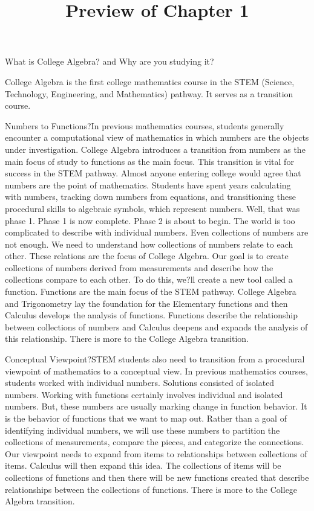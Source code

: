 \documentclass{ximera}
\title{Preview of Chapter 1}
\begin{document}
\begin{abstract}
\end{abstract}

\maketitle


What is College Algebra?
and
Why are you studying it?


College Algebra is the first college mathematics course in the STEM (Science, Technology, Engineering, and Mathematics) pathway. It serves as a transition course.

Numbers to Functions?In previous mathematics courses, students generally encounter a computational view of mathematics in which numbers are the objects under investigation. College Algebra introduces a transition from numbers as the main focus of study to functions as the main focus. This transition is vital for success in the STEM pathway.
Almost anyone entering college would agree that numbers are the point of mathematics.  Students have spent years calculating with numbers, tracking down numbers from equations, and transitioning these procedural skills to algebraic symbols, which represent numbers. Well, that was phase 1.  Phase 1 is now complete.  Phase 2 is about to begin.
The world is too complicated to describe with individual numbers. Even collections of numbers are not enough. We need to understand how collections of numbers relate to each other. These relations are the focus of College Algebra.
Our goal is to create collections of numbers derived from measurements and describe how the collections compare to each other. To do this, we?ll create a new tool called a function.
Functions are the main focus of the STEM pathway.  College Algebra and Trigonometry lay the foundation for the Elementary functions and then Calculus develops the analysis of functions.  Functions describe the relationship between collections of numbers and Calculus deepens and expands the analysis of this relationship.
There is more to the College Algebra transition.

Conceptual Viewpoint?STEM students also need to transition from a procedural viewpoint of mathematics to a conceptual view. In previous mathematics courses, students worked with individual numbers. Solutions consisted of isolated numbers. Working with functions certainly involves individual and isolated numbers. But, these numbers are usually marking change in function behavior. It is the behavior of functions that we want to map out. Rather than a goal of identifying individual numbers, we will use these numbers to partition the collections of measurements, compare the pieces, and categorize the connections. Our viewpoint needs to expand from items to relationships between collections of items.
Calculus will then expand this idea.  The collections of items will be collections of functions and then there will be new functions created that describe relationships between the collections of functions.
There is more to the College Algebra transition.
\end{document}
